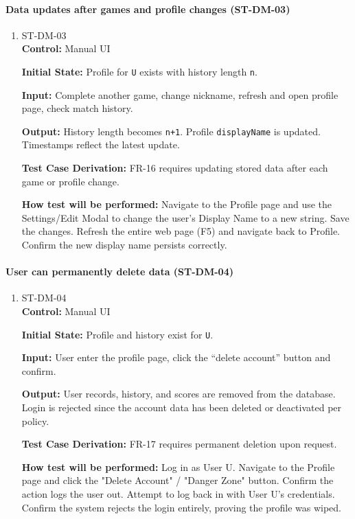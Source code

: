 \documentclass[12pt, titlepage]{article}
\begin{document}
\paragraph{Data updates after games and profile changes (ST-DM-03)}
\begin{enumerate}
\item{ST-DM-03\\}
\textbf{Control:} Manual UI

\textbf{Initial State:} Profile for \texttt{U} exists with history length \texttt{n}.

\textbf{Input:} Complete another game, change nickname, refresh and open profile page, check match history.

\textbf{Output:} History length becomes \texttt{n+1}. Profile \texttt{displayName} is updated. Timestamps reflect the latest update.

\textbf{Test Case Derivation:} FR-16 requires updating stored data after each game or profile change.

\textbf{How test will be performed:} Navigate to the Profile page and use the Settings/Edit Modal to change the user's Display Name to a new string. Save the changes. Refresh the entire web page (F5) and navigate back to Profile. Confirm the new display name persists correctly.
\end{enumerate}

\paragraph{User can permanently delete data (ST-DM-04)}
\begin{enumerate}
\item{ST-DM-04\\}
\textbf{Control:} Manual UI

\textbf{Initial State:} Profile and history exist for \texttt{U}.

\textbf{Input:} User enter the profile page, click the ``delete account'' button and confirm.

\textbf{Output:} User records, history, and scores are removed from the database. Login is rejected since the account data has been deleted or deactivated per policy.

\textbf{Test Case Derivation:} FR-17 requires permanent deletion upon request.

\textbf{How test will be performed:} Log in as User U. Navigate to the Profile page and click the "Delete Account" / "Danger Zone" button. Confirm the action logs the user out. Attempt to log back in with User U's credentials. Confirm the system rejects the login entirely, proving the profile was wiped.
\end{enumerate}
\end{document}
